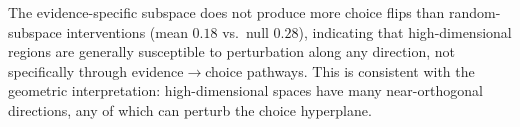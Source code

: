 \documentclass{article}
\begin{document}
The evidence-specific subspace does not produce more choice flips than random-subspace interventions (mean $0.18$ vs.\ null $0.28$), indicating that high-dimensional regions are generally susceptible to perturbation along any direction, not specifically through evidence$\to$choice pathways. This is consistent with the geometric interpretation: high-dimensional spaces have many near-orthogonal directions, any of which can perturb the choice hyperplane.
\end{document}
